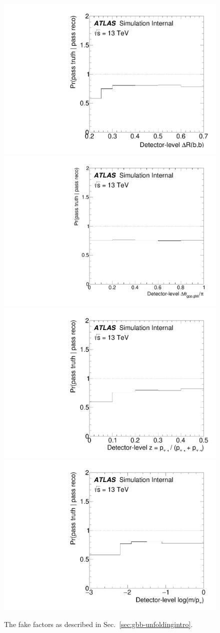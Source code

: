 \begin{figure}[htpb!]
\begin{center}
  \includegraphics[width=0.45\linewidth]{figures/gbb/Unfolding/dR_fake_factor.pdf}
  \includegraphics[width=0.45\linewidth]{figures/gbb/Unfolding/dphi_fake_factor.pdf}\\
  \includegraphics[width=0.45\linewidth]{figures/gbb/Unfolding/ZpT_fake_factor.pdf}
  \includegraphics[width=0.45\linewidth]{figures/gbb/Unfolding/fracmasspt_fake_factor.pdf}
\caption[]{The fake factors as described in Sec.~\ref{sec:gbb-unfoldingintro}.} 
\label{fig:gbb-fake}
\end{center}
\end{figure}

